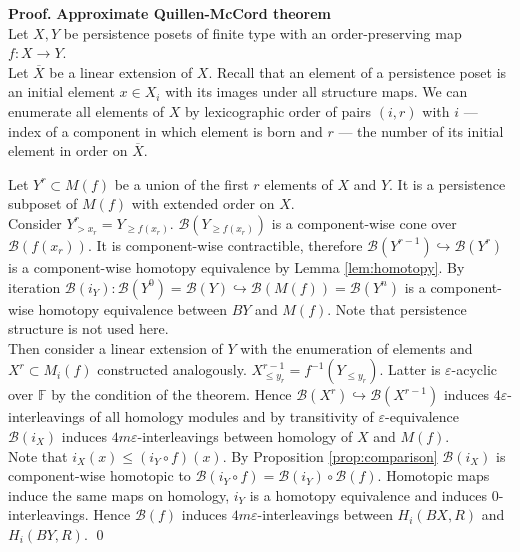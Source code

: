 \documentclass[a4paper, 12pt]{article}
\numberwithin{equation}{section}
\theoremstyle{definition}
\theoremstyle{remark}
\newenvironment{pf}{\noindent\textbf{Proof.}}{\qed}
\renewcommand{\leq}{\leqslant}
\renewcommand{\geq}{\geqslant}
\begin{document}
\begin{pf} \textbf{Approximate Quillen-McCord theorem}\\
  Let $X, Y$ be persistence posets of finite type with an order-preserving map $f : X \to Y$.\\

  Let $\overline{X}$ be a linear extension of $X$. Recall that an element of a persistence poset is an initial element $x \in X_i$ with its images under all structure maps. We can enumerate all elements of $X$ by lexicographic order of pairs $(i,r)$ with $i$ --- index of a component in which element is born and $r$ --- the number of its initial element in order on $\overline{X}$.

  Let $Y^r \subset M(f)$ be a union of the first $r$ elements of $X$ and $Y$. It is a persistence subposet of $M(f)$ with extended order on $X$.\\

  Consider $Y^r_{>x_r} = Y_{\geq f(x_r)}$. $\mathcal{B}(Y_{\geq f(x_r)})$ is a component-wise cone over $\mathcal{B}(f(x_r))$. It is component-wise contractible, therefore $\mathcal{B}(Y^{r-1}) \hookrightarrow \mathcal{B}(Y^{r})$ is a component-wise homotopy equivalence by Lemma \ref{lem:homotopy}. By iteration $\mathcal{B}(i_Y) : \mathcal{B}(Y^{0}) = \mathcal{B}(Y) \hookrightarrow \mathcal{B}(M(f)) = \mathcal{B}(Y^n)$ is a component-wise homotopy equivalence between $BY$ and $M(f)$. Note that persistence structure is not used here.\\

  Then consider a linear extension of $Y$ with the enumeration of elements and $X^r \subset M_i(f)$ constructed analogously. $X^{r-1}_{\leq y_r} = f^{-1}(Y_{\leqslant y_r})$. Latter is $\varepsilon$-acyclic over $\mathbb{F}$ by the condition of the theorem. Hence $\mathcal{B}(X^{r}) \hookrightarrow \mathcal{B}(X^{r-1})$ induces $4\varepsilon$-interleavings of all homology modules and by transitivity of $\varepsilon$-equivalence $\mathcal{B}(i_X)$ induces $4m\varepsilon$-interleavings between homology of $X$ and $M(f)$.\\

  Note that $i_X(x) \leqslant (i_Y \circ f)(x)$. By Proposition \ref{prop:comparison} $\mathcal{B}(i_X)$ is component-wise homotopic to $\mathcal{B}(i_Y \circ f) = \mathcal{B}(i_Y) \circ \mathcal{B}(f)$. Homotopic maps induce the same maps on homology, $i_Y$ is a homotopy equivalence and induces $0$-interleavings. Hence $\mathcal{B}(f)$ induces $4m\varepsilon$-interleavings between $H_i(BX,R)$ and $H_i(BY,R)$.
\end{pf}\\
\end{document}
